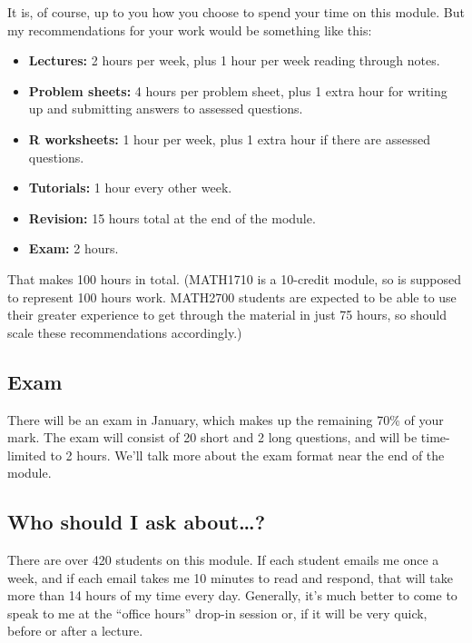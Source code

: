 \documentclass[
  letterpaper,
]{report}
\providecommand{\tightlist}{%
  \setlength{\itemsep}{0pt}\setlength{\parskip}{0pt}}\usepackage{longtable,booktabs,array}
\theoremstyle{definition}
\theoremstyle{definition}
\theoremstyle{remark}
\begin{document}
It is, of course, up to you how you choose to spend your time on this
module. But my recommendations for your work would be something like
this:

\begin{itemize}
\tightlist
\item
  \textbf{Lectures:} 2 hours per week, plus 1 hour per week reading
  through notes.
\item
  \textbf{Problem sheets:} 4 hours per problem sheet, plus 1 extra hour
  for writing up and submitting answers to assessed questions.
\item
  \textbf{R worksheets:} 1 hour per week, plus 1 extra hour if there are
  assessed questions.
\item
  \textbf{Tutorials:} 1 hour every other week.
\item
  \textbf{Revision:} 15 hours total at the end of the module.
\item
  \textbf{Exam:} 2 hours.
\end{itemize}

That makes 100 hours in total. (MATH1710 is a 10-credit module, so is
supposed to represent 100 hours work. MATH2700 students are expected to
be able to use their greater experience to get through the material in
just 75 hours, so should scale these recommendations accordingly.)

\hypertarget{exam}{%
\subsection*{Exam}\label{exam}}

There will be an exam in January, which makes up the remaining 70\% of
your mark. The exam will consist of 20 short and 2 long questions, and
will be time-limited to 2 hours. We'll talk more about the exam format
near the end of the module.

\hypertarget{ask}{%
\subsection*{Who should I ask about\ldots?}\label{ask}}

There are over 420 students on this module. If each student emails me
once a week, and if each email takes me 10 minutes to read and respond,
that will take more than 14 hours of my time every day. Generally, it's
much better to come to speak to me at the ``office hours'' drop-in
session or, if it will be very quick, before or after a lecture.
\end{document}
